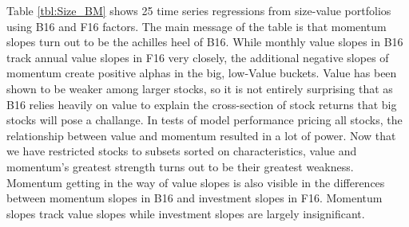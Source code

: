 
Table \ref{tbl:Size_BM} shows 25 time series regressions from size-value
portfolios using B16 and F16 factors.
The main message of the table is that momentum slopes turn out to be the
achilles heel of B16. While monthly value slopes in B16 track annual value
slopes in F16 very closely, the additional negative slopes of momentum create
positive alphas in the big, low-Value buckets.
Value has been shown to be weaker among larger stocks, so it is not entirely
surprising that as B16 relies heavily on value to explain the cross-section of
stock returns that big stocks will pose a challange.
In tests of model performance pricing all stocks, the relationship between
value and momentum resulted in a lot of power.
Now that we have restricted stocks to subsets sorted on characteristics, value
and momentum's greatest strength turns out to be their greatest weakness.
Momentum getting in the way of value slopes is also visible in the differences
between momentum slopes in B16 and investment slopes in F16.
Momentum slopes track value slopes while investment slopes are largely
insignificant.

